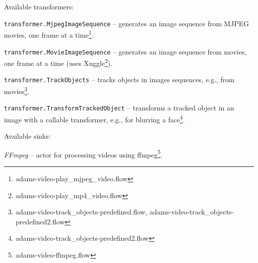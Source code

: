 \documentclass[a4paper]{book}
\begin{document}
\noindent Available transformers:
\begin{tight_itemize}
	\item \texttt{transformer.MjpegImageSequence} -- generates an image sequence
	from MJPEG movies, one frame at a time\footnote{adams-video-play\_mjpeg\_video.flow}.
	\item \texttt{transformer.MovieImageSequence} -- generates an image sequence
	from movies, one frame at a time (uses Xuggle\cite{xuggle}\footnote{adams-video-play\_mp4\_video.flow}).
	\item \texttt{transformer.TrackObjects} -- tracks objects in images sequences,
	e.g., from movies\footnote{adams-video-track\_objects-predefined.flow, adams-video-track\_objects-predefined2.flow}.
	\item \texttt{transformer.TransformTrackedObject} -- transforms a tracked
	object in an image with a callable transformer, e.g., for blurring a
	face\footnote{adams-video-track\_objects-predefined2.flow}.
\end{tight_itemize}

\noindent Available sinks:
\begin{tight_itemize}
  \item \textit{FFmpeg} -- actor for processing videos using
  ffmpeg\cite{ffmpeg}\footnote{adams-video-ffmpeg.flow}.
\end{tight_itemize}



\end{document}
